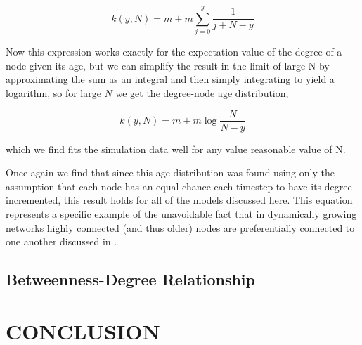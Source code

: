 \documentclass[aps,pre,reprint,superscriptaddress,amsmath,amssymb]{revtex4-1}
\begin{document}
\[k(y,N) = m + m\sum_{j=0}^{y} \frac{1}{j+N-y}\]

Now this expression works exactly for the expectation value of the degree of a node given its age, but we can simplify the result in the limit of large N by approximating the sum as an integral and then simply integrating to yield a logarithm, so for large $N$ we get the degree-node age distribution,

\[k(y,N) = m + m\log{\frac{N}{N-y}}\]

which we find fits the simulation data well for any value reasonable value of N.
 
Once again we find that since this age distribution was found using only the assumption that each node has an equal chance each timestep to have its degree incremented, this result holds for all of the models discussed here.
This equation represents a specific example of the unavoidable fact that in dynamically growing networks highly connected (and thus older) nodes are preferentially connected to one another discussed in \cite{reallyrandom}.


\subsection{Betweenness-Degree Relationship}


\section{CONCLUSION}


\end{document}
